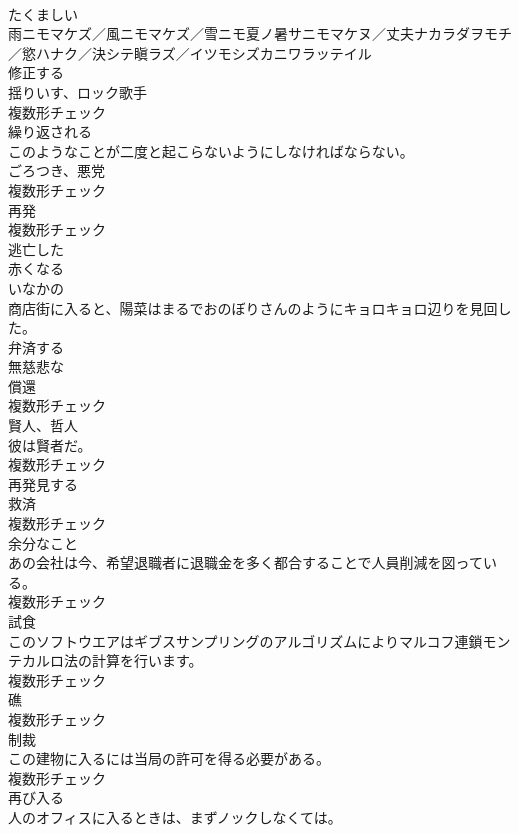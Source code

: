 \documentclass[8pt]{extreport}
\begin{document}
\begin{CJK}{UTF8}{min}
\\	[形容詞]	たくましい	
\\	雨ニモマケズ／風ニモマケズ／雪ニモ夏ノ暑サニモマケヌ／丈夫ナカラダヲモチ／慾ハナク／決シテ瞋ラズ／イツモシズカニワラッテイル	
\\	[動詞]	修正する	
\\	[名詞]	揺りいす、ロック歌手	
\\	複数形チェック
\\	[動詞]	繰り返される	
\\	このようなことが二度と起こらないようにしなければならない。	
\\	[名詞]	ごろつき、悪党	
\\	複数形チェック
\\	[名詞]	再発	
\\	複数形チェック
\\	[形容詞]	逃亡した	
\\	[動詞]	赤くなる	
\\	[形容詞]	いなかの	
\\	商店街に入ると、陽菜はまるでおのぼりさんのようにキョロキョロ辺りを見回した。	
\\	[動詞]	弁済する	
\\	[形容詞]	無慈悲な	
\\	[名詞]	償還	
\\	複数形チェック
\\	[名詞]	賢人、哲人	
\\	彼は賢者だ。	
\\	複数形チェック
\\	[動詞]	再発見する	
\\	[名詞]	救済	
\\	複数形チェック
\\	[名詞]	余分なこと	
\\	あの会社は今、希望退職者に退職金を多く都合することで人員削減を図っている。	
\\	複数形チェック
\\	[名詞]	試食	
\\	このソフトウエアはギブスサンプリングのアルゴリズムによりマルコフ連鎖モンテカルロ法の計算を行います。	
\\	複数形チェック
\\	[名詞]	礁	
\\	複数形チェック
\\	[名詞]	制裁	
\\	この建物に入るには当局の許可を得る必要がある。	
\\	複数形チェック
\\	[動詞]	再び入る	
\\	人のオフィスに入るときは、まずノックしなくては。	

\end{CJK}
\end{document}
